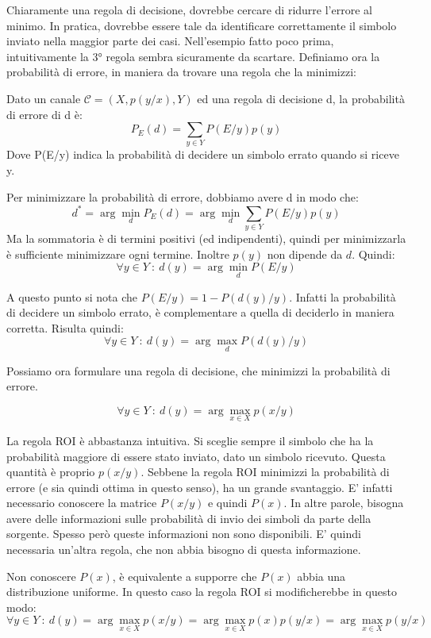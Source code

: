 Chiaramente una regola di decisione, dovrebbe cercare di ridurre l'errore al minimo. In pratica, dovrebbe essere tale da identificare 
correttamente il simbolo inviato nella maggior parte dei casi. Nell'esempio fatto poco prima, intuitivamente la 3° regola sembra sicuramente da scartare.
Definiamo ora la probabilità di errore, in maniera da trovare una regola che la minimizzi:
\begin{definizione}
 Dato un canale $\mathcal{C}=(X,p(y/x),Y)$ ed una regola di decisione d, la probabilità di errore di d è:
\[
 P_E(d)=\sum_{y \in Y} P(E/y)p(y)
\]
Dove P(E/y) indica la probabilità di decidere un simbolo errato quando si riceve y.
\end{definizione}
\noindent
Per minimizzare la probabilità di errore, dobbiamo avere d in modo che:
\[
 d^*=\arg \min_d P_E(d)=\arg \min_d \sum_{y \in Y} P(E/y)p(y)
\]
Ma la sommatoria è di termini positivi (ed indipendenti), quindi per minimizzarla è sufficiente minimizzare ogni termine.
Inoltre $p(y)$ non dipende da $d$. Quindi:
\[
 \forall y \in Y \ : \ d(y)=\arg \min_d P(E/y)
\]

\noindent
A questo punto si nota che $P(E/y)=1-P(d(y)/y)$. Infatti la probabilità di decidere un simbolo errato, è complementare a quella di deciderlo in maniera corretta.
Risulta quindi:
\[
 \forall y \in Y \ : \ d(y)=\arg \max_d P(d(y)/y)
\]

\noindent
Possiamo ora formulare una regola di decisione, che minimizzi la probabilità di errore.

\begin{definizione}
\[
 \forall y \in Y \ : \ d(y)=\arg \max_{x \in X} p(x/y)
\]
\end{definizione}

La regola ROI è abbastanza intuitiva. Si sceglie sempre il simbolo che ha la probabilità maggiore di essere stato inviato, 
dato un simbolo ricevuto. Questa quantità è proprio $p(x/y)$.
Sebbene la regola ROI minimizzi la probabilità di errore (e sia quindi ottima in questo senso), ha un grande svantaggio.
E' infatti necessario conoscere la matrice $P(x/y)$ e quindi $P(x)$. In altre parole, bisogna avere delle informazioni sulle 
probabilità di invio dei simboli da parte della sorgente. Spesso però queste informazioni non sono disponibili. E' quindi necessaria 
un'altra regola, che non abbia bisogno di questa informazione.

Non conoscere $P(x)$, è equivalente a supporre che $P(x)$ abbia una distribuzione uniforme. In questo caso la regola ROI si modificherebbe 
in questo modo:
\[
 \forall y \in Y \ : \ d(y)=\arg \max_{x \in X} p(x/y)=\arg \max_{x \in X} p(x)p(y/x)=\arg \max_{x \in X} p(y/x)
\]

